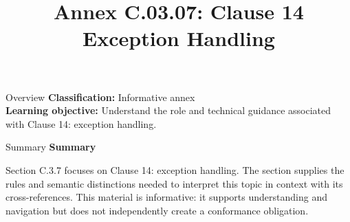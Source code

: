 \documentclass[10pt,letterpaper]{article}
\title{Annex C.03.07: Clause 14 Exception Handling}
\author{}
\date{}
\begin{document}
\maketitle
\begin{CornellOverviewBox}{Overview}
\textbf{Classification:} Informative annex\\[2pt]
\textbf{Learning objective:} Understand the role and technical guidance associated with Clause 14: exception handling.
\end{CornellOverviewBox}\begin{CornellSummaryBox}{Summary}
{\sffamily\bfseries\color{Accent} Summary}\par\vspace{3pt}Section C.3.7 focuses on Clause 14: exception handling. The section supplies the rules and semantic distinctions needed to interpret this topic in context with its cross-references. This material is informative: it supports understanding and navigation but does not independently create a conformance obligation.
\end{CornellSummaryBox}
\end{document}
